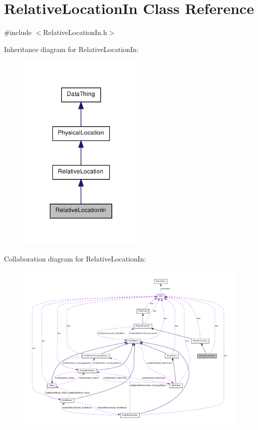 \hypertarget{class_relative_location_in}{
\section{RelativeLocationIn Class Reference}
\label{class_relative_location_in}
}


{\ttfamily \#include $<$RelativeLocationIn.h$>$}



Inheritance diagram for RelativeLocationIn:\nopagebreak
\begin{figure}[H]
\begin{center}
\leavevmode
\includegraphics[width=172pt]{class_relative_location_in__inherit__graph}
\end{center}
\end{figure}


Collaboration diagram for RelativeLocationIn:\nopagebreak
\begin{figure}[H]
\begin{center}
\leavevmode
\includegraphics[width=400pt]{class_relative_location_in__coll__graph}
\end{center}
\end{figure}
